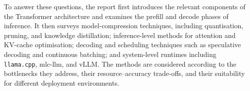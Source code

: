 To answer these questions, the report first introduces the relevant components of the
Transformer architecture and examines the prefill and decode phases of inference. It then
surveys model-compression techniques, including quantisation, pruning, and knowledge
distillation; inference-level methods for attention and KV-cache optimisation; decoding
and scheduling techniques such as speculative decoding and continuous batching; and
system-level runtimes including \texttt{llama.cpp}, \ac{mlc-llm}, and vLLM. The methods are
considered according to the bottlenecks they address, their resource--accuracy trade-offs,
and their suitability for different deployment environments.







